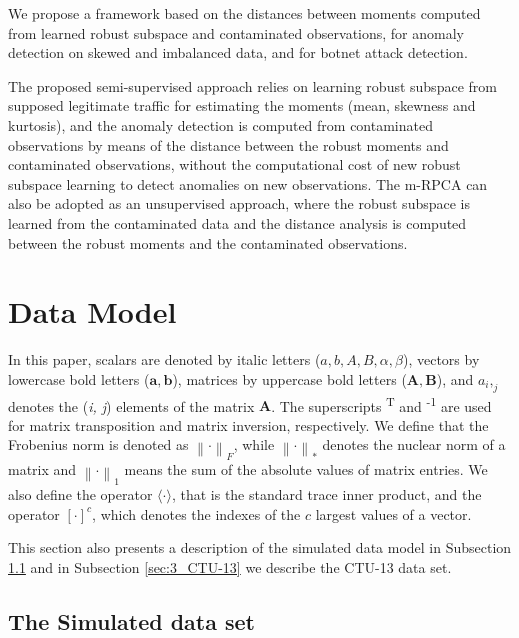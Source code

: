 \documentclass[review]{elsarticle}
\begin{document}
We propose a framework based on the distances between moments computed from learned robust subspace and contaminated observations, for anomaly detection on skewed and imbalanced data, and for botnet attack detection. 

The proposed semi-supervised approach relies on learning robust subspace from supposed legitimate traffic for estimating the moments (mean, skewness and kurtosis), and the anomaly detection is computed from contaminated observations by means of the distance between the robust moments and contaminated observations, without the computational cost of new robust subspace learning to detect anomalies on new observations. The m-RPCA can also be adopted as an unsupervised approach, where the robust subspace is learned from the contaminated data and the distance analysis is computed between the robust moments and the contaminated observations.

\section{Data Model}
\label{sec:datamodel}

In this paper, scalars are denoted by italic letters ($a, b, A, B, \alpha, \beta$), vectors by lowercase bold letters ($\pmb{a}, \pmb{b}$), matrices by uppercase bold letters ($\pmb{A}, \pmb{B}$), and $a_i,_j$ denotes the (\emph{i, j}) elements of the matrix $\pmb{A}$. The superscripts \textsuperscript{T} and \textsuperscript{-1} are used for matrix transposition and matrix inversion, respectively. We define that the Frobenius norm is denoted as $\left\| \mathord{\cdot} \right\|_F$, while $\left\| \mathord{\cdot} \right\|_*$ denotes the nuclear norm of a matrix and $\left\| \mathord{\cdot} \right\|_1$ means the sum of the absolute values of matrix entries. We also define the operator $\langle \mathord{\cdot} \rangle$, that is the standard trace inner product, and the operator $[ \mathord{\cdot} ]^c$, which denotes the indexes of the $c$ largest values of a vector.

This section also presents a description of the simulated data model in Subsection \ref{sec:3_simulation} and in Subsection \ref{sec:3_CTU-13} we describe the CTU-13 data set.


\subsection{The Simulated data set}
\label{sec:3_simulation}
\end{document}

